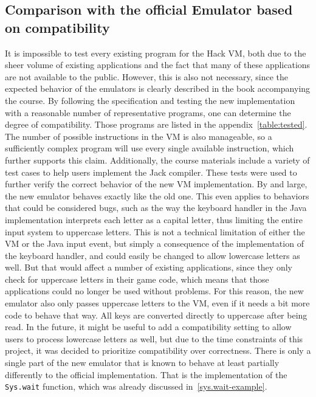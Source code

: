 \subsection{Comparison with the official Emulator based on compatibility} \label{compatibility}
It is impossible to test every existing program for the Hack VM, both due to the sheer volume of existing applications and the fact that many of these applications are not available to the public.
However, this is also not necessary, since the expected behavior of the emulators is clearly described in the book accompanying the course.
By following the specification and testing the new implementation with a reasonable number of representative programs, one can determine the degree of compatibility.
Those programs are listed in the appendix~\ref{table:tested}.
The number of possible instructions in the VM is also manageable, so a sufficiently complex program will use every single available instruction, which further supports this claim.
Additionally, the course materials include a variety of test cases to help users implement the Jack compiler.
These tests were used to further verify the correct behavior of the new VM implementation.
By and large, the new emulator behaves exactly like the old one.
This even applies to behaviors that could be considered bugs, such as the way the keyboard handler in the Java implementation interprets each letter as a capital letter, thus limiting the entire input system to uppercase letters.
This is not a technical limitation of either the VM or the Java input event, but simply a consequence of the implementation of the keyboard handler, and could easily be changed to allow lowercase letters as well.
But that would affect a number of existing applications, since they only check for uppercase letters in their game code, which means that those applications could no longer be used without problems.
For this reason, the new emulator also only passes uppercase letters to the VM, even if it needs a bit more code to behave that way.
All keys are converted directly to uppercase after being read.
In the future, it might be useful to add a compatibility setting to allow users to process lowercase letters as well, but due to the time constraints of this project, it was decided to prioritize compatibility over correctness.
There is only a single part of the new emulator that is known to behave at least partially differently to the official implementation.
That is the implementation of the \verb+Sys.wait+ function, which was already discussed in~\cref{sys.wait-example}.

